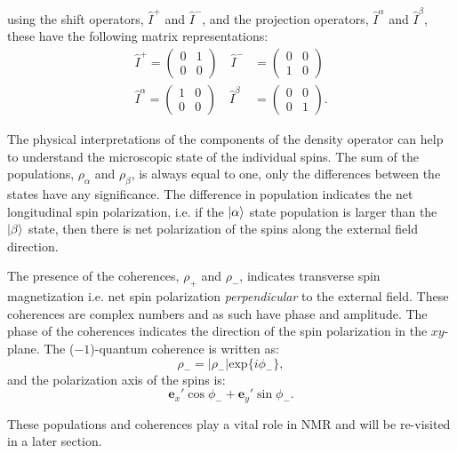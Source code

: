 using the shift operators, $\hat{I}^+$ and $\hat{I}^-$, and the projection operators, $\hat{I}^\alpha$ and $\hat{I}^\beta$, these have the following matrix representations:
\begin{align*}
  \hat{I}^+ = \begin{pmatrix}
    0 & 1\\
    0 & 0
\end{pmatrix}\quad\hat{I}^- &= \begin{pmatrix}
  0 & 0\\
  1 & 0
\end{pmatrix}\\
\hat{I}^\alpha = \begin{pmatrix}
  1 & 0\\
  0 & 0
\end{pmatrix}\quad\hat{I}^\beta &= \begin{pmatrix}
  0 & 0\\
  0 & 1
\end{pmatrix}.
\end{align*}

The physical interpretations of the components of the density operator can help to understand the microscopic state
of the individual spins. The sum of the populations, $\rho_\alpha$ and $\rho_\beta$, is always equal to one, only the differences between the states
have any significance. The difference in population indicates the net longitudinal spin polarization, i.e. if the
$\ket{\alpha}$ state population is larger than the $\ket{\beta}$ state, then there is net polarization of the spins
along the external field direction.

The presence of the coherences, $\rho_+$ and $\rho_-$, indicates transverse spin magnetization i.e. net spin
polarization \textit{perpendicular} to the external field. These coherences are complex numbers and as
such have phase and amplitude. The phase of the coherences indicates the direction of the spin polarization
in the $xy$-plane. The ($-1$)-quantum coherence is written as:
\begin{equation}
  \rho_-= |\rho_-|\text{exp}\{i\phi_-\},
\end{equation}
and the polarization  axis of the spins is:
\begin{equation}
  \mathbf{e}_x'\cos\phi_- + \mathbf{e}_y'\sin\phi_-.
\end{equation}

These populations and coherences play a vital role in NMR and will be re-visited in a later section.


